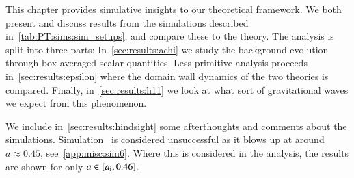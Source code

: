 


\newcommand{\lbl}[1]{\textsf{\textbf{#1}}}
\newcommand{\completelbl}[4]{%
\textbf{#1)}%
\textbf{#2:}%
\lbl{#3.#4}%
}
\newcommand{\lcoord}{\ALIASlcoord}
\newcommand{\lcoordx}{\ALIASlcoordx}
\newcommand{\lcoordk}{\ALIASlcoordk}
\newcommand{\epsA}{\ALIASepsA}
\newcommand{\epsB}{\ALIASepsB}
\newcommand{\epsC}{\ALIASepsC}
\newcommand{\wallsep}{\ALIASwallsep}









This chapter provides simulative insights to our theoretical framework. We both present and discuss results from the simulations described in~\cref{tab:PT:sims:sim_setups}, and compare these to the theory. The analysis is split into three parts: In~\cref{sec:results:achi} we study the background evolution through box-averaged scalar quantities. Less primitive analysis proceeds in~\cref{sec:results:epsilon} where the domain wall dynamics of the two theories is compared. Finally, in~\cref{sec:results:h11} we look at what sort of gravitational waves we expect from this phenomenon. 

We include in~\cref{sec:results:hindsight} some afterthoughts and comments about the simulations. %
Simulation~ is considered unsuccessful as it blows up at around $a\approx 0.45$, see~\cref{app:misc:sim6}. Where this is considered in the analysis, the results are shown for only $a\in [a_\mathrm{i}, 0.46]$.







